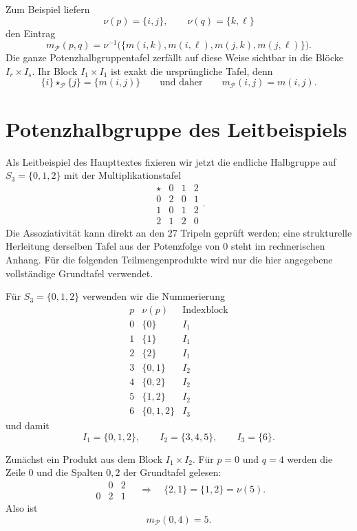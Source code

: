 \documentclass[main.tex]{subfiles}
\begin{document}
Zum Beispiel liefern
\[
  \nu(p)=\{i,j\},
  \qquad
  \nu(q)=\{k,\ell\}
\]
den Eintrag
\[
  m_{\mathcal P}(p,q)
  =
  \nu^{-1}\!\bigl(
    \{m(i,k),m(i,\ell),m(j,k),m(j,\ell)\}
  \bigr).
\]
Die ganze Potenzhalbgruppentafel zerfällt auf diese Weise sichtbar in die
Blöcke \(I_r\times I_s\).  Ihr Block \(I_1\times I_1\) ist exakt die
ursprüngliche Tafel, denn
\[
  \{i\}\star_{\mathcal P}\{j\}=\{m(i,j)\}
  \qquad\text{und daher}\qquad
  m_{\mathcal P}(i,j)=m(i,j).
\]


\section{Potenzhalbgruppe des Leitbeispiels}

Als Leitbeispiel des Haupttextes fixieren wir jetzt die endliche Halbgruppe
auf \(S_3=\{0,1,2\}\) mit der Multiplikationstafel
\[
\begin{array}{c|ccc}
\star&0&1&2\\\hline
0&2&0&1\\
1&0&1&2\\
2&1&2&0
\end{array}.
\]
Die Assoziativität kann direkt an den \(27\) Tripeln geprüft werden; eine
strukturelle Herleitung derselben Tafel aus der Potenzfolge von \(0\) steht
im rechnerischen Anhang.  Für die folgenden Teilmengenprodukte wird nur die
hier angegebene vollständige Grundtafel verwendet.

Für \(S_3=\{0,1,2\}\) verwenden wir die Nummerierung
\[
\begin{array}{c|c|c}
p&\nu(p)&\text{Indexblock}\\\hline
0&\{0\}&I_1\\
1&\{1\}&I_1\\
2&\{2\}&I_1\\\hline
3&\{0,1\}&I_2\\
4&\{0,2\}&I_2\\
5&\{1,2\}&I_2\\\hline
6&\{0,1,2\}&I_3
\end{array}
\]
und damit
\[
  I_1=\{0,1,2\},
  \qquad
  I_2=\{3,4,5\},
  \qquad
  I_3=\{6\}.
\]

Zunächst ein Produkt aus dem Block \(I_1\times I_2\).  Für \(p=0\) und
\(q=4\) werden die Zeile \(0\) und die Spalten \(0,2\) der Grundtafel
gelesen:
\[
\begin{array}{c|cc}
&0&2\\\hline
0&2&1
\end{array}
\quad\Longrightarrow\quad
\{2,1\}=\{1,2\}=\nu(5).
\]
Also ist
\[
  m_{\mathcal P}(0,4)=5.
\]
\end{document}
